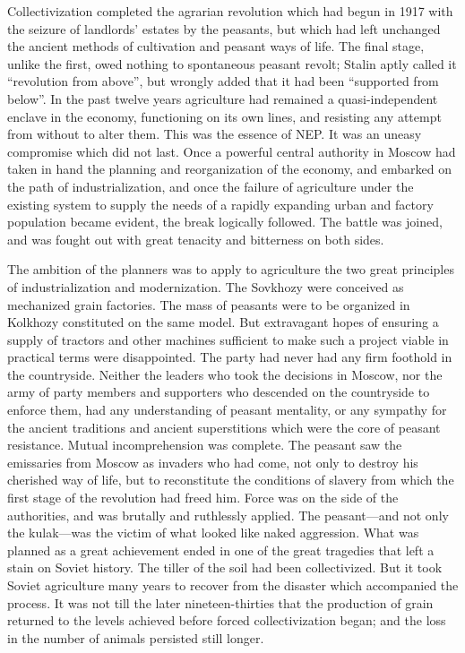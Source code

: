 Collectivization completed the agrarian revolution which had begun in 1917 with the seizure of landlords' estates by the peasants, but which had left unchanged the ancient methods of cultivation and peasant ways of life. The final stage, unlike the first, owed nothing to spontaneous peasant revolt; Stalin aptly called it ``revolution from above'', but wrongly added that it had been ``supported from below''. In the past twelve years agriculture had remained a quasi-independent enclave in the economy, functioning on its own lines, and resisting any attempt from without to alter them. This was the essence of NEP. It was an uneasy compromise which did not last. Once a powerful central authority in Moscow had taken in hand the planning and reorganization of the economy, and embarked on the path of industrialization, and once the failure of agriculture under the existing system to supply the needs of a rapidly expanding urban and factory population became evident, the break logically followed. The battle was joined, and was fought out with great tenacity and bitterness on both sides. 

The ambition of the planners was to apply to agriculture the two great principles of industrialization and modernization. The Sovkhozy were conceived as mechanized grain factories. The mass of peasants were to be organized in Kolkhozy constituted on the same model. But extravagant hopes of ensuring a supply of tractors and other machines sufficient to make such a project viable in practical terms were disappointed. The party had never had any firm foothold in the countryside. Neither the leaders who took the decisions in Moscow, nor the army of party members and supporters who descended on the countryside to enforce them, had any understanding of peasant mentality, or any sympathy for the ancient traditions and ancient superstitions which were the core of peasant resistance. Mutual incomprehension was complete. The peasant saw the emissaries from Moscow as invaders who had come, not only to destroy his cherished way of life, but to reconstitute the conditions of slavery from which the first stage of the revolution had freed him. Force was on the side of the authorities, and was brutally and ruthlessly applied. The peasant---and not only the kulak---was the victim of what looked like naked aggression. What was planned as a great achievement ended in one of the great tragedies that left a stain on Soviet history. The tiller of the soil had been collectivized. But it took Soviet agriculture many years to recover from the disaster which accompanied the process. It was not till the later nineteen-thirties that the production of grain returned to the levels achieved before forced collectivization began; and the loss in the number of animals persisted still longer. 

